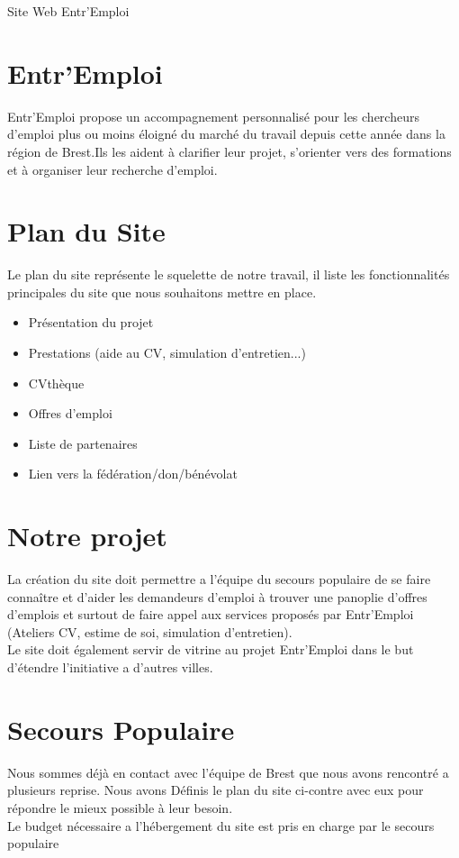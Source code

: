\documentclass[a4paper, 12pt]{article}
\begin{document}
\begin{center}\Huge Site Web Entr'Emploi\end{center}
\vskip2cm

\begin{multicols}{2}
\section*{Entr'Emploi}
Entr'Emploi propose un accompagnement personnalisé pour les chercheurs d'emploi plus ou moins éloigné du marché du travail depuis cette année dans la région de Brest.Ils les aident à clarifier leur projet, s'orienter vers des formations et à organiser leur recherche d'emploi.

\section*{Plan du Site}
Le plan du site représente le squelette de notre travail, il liste les fonctionnalités principales du site que nous souhaitons mettre en place.
\begin{itemize}
    \item Présentation du projet
    \item Prestations (aide au CV, simulation d'entretien...)
    \item CVthèque
    \item Offres d'emploi
    \item Liste de partenaires
    \item Lien vers la fédération/don/bénévolat
\end{itemize}

\section*{Notre projet}
La création du site doit permettre a l'équipe du secours populaire de se faire connaître et d'aider les demandeurs d'emploi à trouver une panoplie d'offres d'emplois et surtout de faire
appel aux services proposés par Entr'Emploi (Ateliers CV, estime de soi, simulation d'entretien).\\
Le site doit également servir de vitrine au projet Entr'Emploi dans le but d'étendre l’initiative a d'autres villes.

\section*{Secours Populaire}
Nous sommes déjà en contact avec l'équipe de Brest que nous avons rencontré a plusieurs reprise. Nous avons Définis le plan du site ci-contre avec eux pour répondre le mieux possible à leur besoin.\\
Le budget nécessaire a l’hébergement du site est pris en charge par le secours populaire
\end{multicols}
\end{document}
